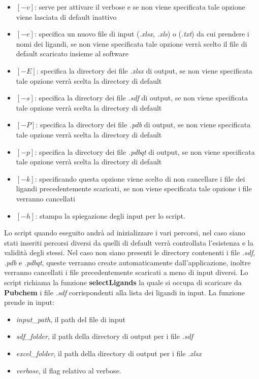 \begin{itemize}
    \item $[-v]$: serve per attivare il verbose e se non viene specificata tale opzione viene lasciata di default inattivo
    \item $[-e]$: specifica un nuovo file di input (\textit{.xlsx}, \textit{.xls}) o (\textit{.txt}) da cui prendere i nomi dei ligandi, se non viene specificata tale opzione verrà scelto il file di default scaricato insieme al software
    \item $[-E]$: specifica la directory dei file \textit{.xlsx} di output, se non viene specificata tale opzione verrà scelta la directory di default
    \item $[-s]$: specifica la directory dei file \textit{.sdf} di output, se non viene specificata tale opzione verrà scelta la directory di default
    \item $[-P]$: specifica la directory dei file \textit{.pdb} di output, se non viene specificata tale opzione verrà scelta la directory di default
    \item $[-p]$: specifica la directory dei file \textit{.pdbqt} di output, se non viene specificata tale opzione verrà scelta la directory di default
    \item $[-k]$: specificando questa opzione viene scelto di non cancellare i file dei ligandi precedentemente scaricati, se non viene specificata tale opzione i file verranno cancellati
    \item $[-h]$: stampa la spiegazione degli input per lo script.
\end{itemize}

Lo script quando eseguito andrà ad inizializzare i vari percorsi, nel caso siano stati inseriti percorsi diversi da quelli di default verrà controllata l'esistenza e la validità degli stessi. Nel caso non siano presenti le directory contenenti i file \textit{.sdf}, \textit{.pdb} e \textit{.pdbqt}, queste verranno create automaticamente dall'applicazione, inoltre verranno cancellati i file precedentemente scaricati a meno di input diversi.\newline
Lo script richiama la funzione \textbf{selectLigands} la quale si occupa di scaricare da \textbf{Pubchem}
i file \textit{.sdf} corrispondenti alla lista dei ligandi in input. La funzione prende in input: 

\begin{itemize}
    \item \textit{input\_path}, il path del file di input
    \item \textit{sdf\_folder}, il path della directory di output per i file \textit{.sdf}
    \item \textit{excel\_folder}, il path della directory di output per i file \textit{.xlsx}
    \item \textit{verbose}, il flag relativo al verbose.
\end{itemize}

